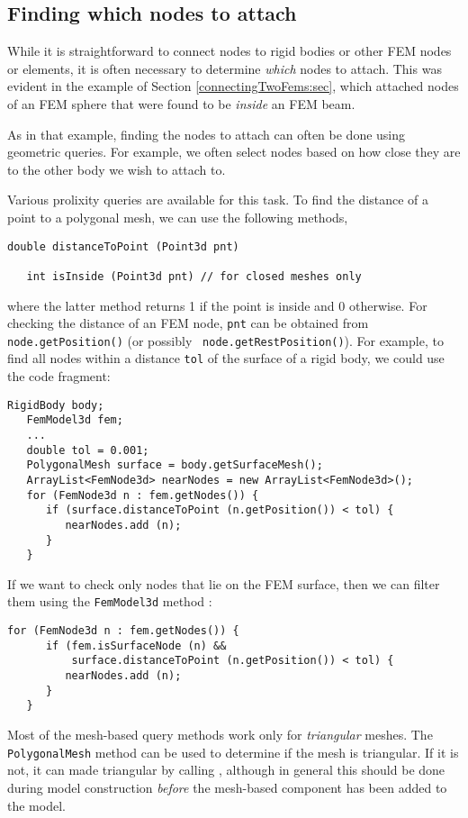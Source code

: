 \subsection{Finding which nodes to attach}

While it is straightforward to connect nodes to rigid bodies or other
FEM nodes or elements, it is often necessary to determine {\it which}
nodes to attach. This was evident in the example of
Section \ref{connectingTwoFems:sec}, which attached nodes of an FEM
sphere that were found to be {\it inside} an FEM beam.

As in that example, finding the nodes to attach can often be done
using geometric queries. For example, we often select nodes based on
how close they are to the other body we wish to attach to.

Various prolixity queries are available for this task. To find the
distance of a point to a polygonal mesh, we can use the
following  methods,
%
\begin{lstlisting}[]
   double distanceToPoint (Point3d pnt)

   int isInside (Point3d pnt) // for closed meshes only
\end{lstlisting}
%
where the latter method returns 1 if the point is inside and 0
otherwise. For checking the distance of an FEM node, {\tt pnt} can be obtained
from {\tt node.getPosition()} (or possibly {\tt
node.getRestPosition()}). For example,
to find all nodes within a distance {\tt tol} of the surface
of a rigid body, we could use the code fragment:
%
\begin{lstlisting}[]
   RigidBody body;
   FemModel3d fem;
   ...
   double tol = 0.001;
   PolygonalMesh surface = body.getSurfaceMesh();
   ArrayList<FemNode3d> nearNodes = new ArrayList<FemNode3d>();
   for (FemNode3d n : fem.getNodes()) {
      if (surface.distanceToPoint (n.getPosition()) < tol) {
         nearNodes.add (n);
      }
   }
\end{lstlisting}
%
If we want to check only nodes that lie on the FEM surface, then we
can filter them using the {\tt FemModel3d}
method :
%
\begin{lstlisting}[]
   for (FemNode3d n : fem.getNodes()) {
      if (fem.isSurfaceNode (n) &&
          surface.distanceToPoint (n.getPosition()) < tol) {
         nearNodes.add (n);
      }
   }
\end{lstlisting}
%
\begin{sideblock}
Most of the mesh-based query methods work only for {\it triangular}
meshes. The {\tt PolygonalMesh} method
can be used to determine if the mesh is triangular. If it
is not, it can made triangular by calling
,
although in general this should be done during model construction {\it
before} the mesh-based component has been added to the model.
\end{sideblock}


